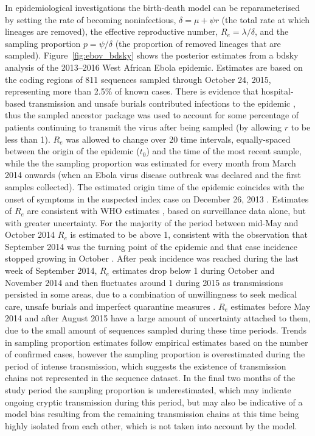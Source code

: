 \clearpage 



\noindent
In epidemiological investigations the birth-death model can be reparameterised by setting the rate of becoming noninfectious, $\delta = \mu + \psi r$ (the total rate at which lineages are removed), the effective reproductive number, $R_e = \lambda / \delta$, and the sampling proportion $p = \psi / \delta$ (the proportion of removed lineages that are sampled). 
Figure~\ref{fig:ebov_bdsky} shows the posterior estimates from a bdsky analysis of the 2013--2016 West African Ebola epidemic. Estimates are based on the coding regions of 811 sequences sampled through October 24, 2015, representing more than 2.5\% of known cases. 
There is evidence that hospital-based transmission and unsafe burials contributed infections to the epidemic \citep{Whitty2014Nature}, thus the sampled ancestor package was used to account for some percentage of patients continuing to transmit the virus after being sampled (by allowing $r$ to be less than 1). 
$R_e$ was allowed to change over 20 time intervals, equally-spaced between the origin of the epidemic ($t_0$) and the time of the most recent sample, while the the sampling proportion was estimated for every month from March 2014 onwards (when an Ebola virus disease outbreak was declared and the first samples collected). 
The estimated origin time of the epidemic coincides with the onset of symptoms in the suspected index case on December 26, 2013 \citep{WHO2016NEJM}.
Estimates of $R_e$ are consistent with WHO estimates \citep{WHO2015NEJM}, based on surveillance data alone, but with greater uncertainty. 
For the majority of the period between mid-May and October 2014 $R_e$ is estimated to be above 1, consistent with the observation that September 2014 was the turning point of the epidemic and that case incidence stopped growing in October \citep{WHO2015NEJM}. 
After peak incidence was reached during the last week of September 2014, $R_e$ estimates drop below 1 during October and November 2014 and then fluctuates around 1 during 2015 as transmissions persisted in some areas, due to a combination of unwillingness to seek medical care, unsafe burials and imperfect quarantine measures \citep{WHO2016NEJM}. %
$R_e$ estimates before May 2014 and after August 2015 have a large amount of uncertainty attached to them, due to the small amount of sequences sampled during these time periods.
Trends in sampling proportion estimates follow empirical estimates based on the number of confirmed cases, however the sampling proportion is overestimated during the period of intense transmission, which suggests the existence of transmission chains not represented in the sequence dataset. 
In the final two months of the study period the sampling proportion is underestimated, which may indicate ongoing cryptic transmission during this period, but may also be indicative of a model bias resulting from the remaining transmission chains at this time being highly isolated from each other, which is not taken into account by the model. 


